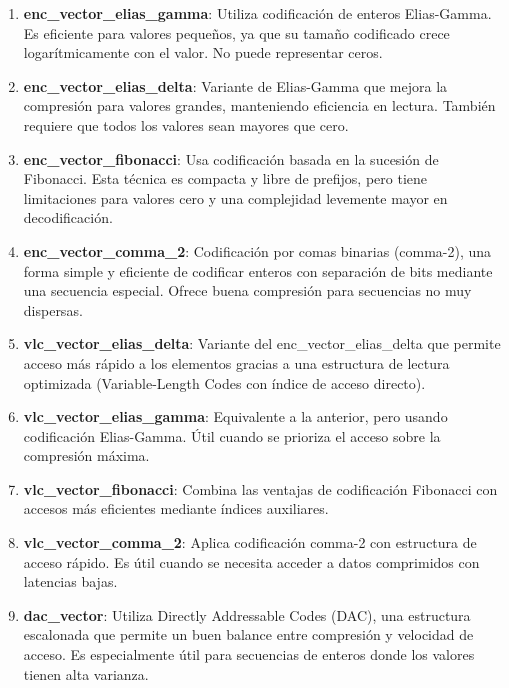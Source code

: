 \begin{enumerate}
    \item \textbf{enc\_vector\_elias\_gamma}:
    Utiliza codificación de enteros Elias-Gamma. Es eficiente para valores pequeños, ya que su tamaño codificado crece logarítmicamente con el valor. No puede representar ceros.

    \item \textbf{enc\_vector\_elias\_delta}:
    Variante de Elias-Gamma que mejora la compresión para valores grandes, manteniendo eficiencia en lectura. También requiere que todos los valores sean mayores que cero.

    \item \textbf{enc\_vector\_fibonacci}:
    Usa codificación basada en la sucesión de Fibonacci. Esta técnica es compacta y libre de prefijos, pero tiene limitaciones para valores cero y una complejidad levemente mayor en decodificación.

    \item \textbf{enc\_vector\_comma\_2}:
    Codificación por comas binarias (comma-2), una forma simple y eficiente de codificar enteros con separación de bits mediante una secuencia especial. Ofrece buena compresión para secuencias no muy dispersas.

    \item \textbf{vlc\_vector\_elias\_delta}:
    Variante del enc\_vector\_elias\_delta que permite acceso más rápido a los elementos gracias a una estructura de lectura optimizada (Variable-Length Codes con índice de acceso directo).

    \item \textbf{vlc\_vector\_elias\_gamma}:
    Equivalente a la anterior, pero usando codificación Elias-Gamma. Útil cuando se prioriza el acceso sobre la compresión máxima.

    \item \textbf{vlc\_vector\_fibonacci}:
    Combina las ventajas de codificación Fibonacci con accesos más eficientes mediante índices auxiliares.

    \item \textbf{vlc\_vector\_comma\_2}:
    Aplica codificación comma-2 con estructura de acceso rápido. Es útil cuando se necesita acceder a datos comprimidos con latencias bajas.

    \item \textbf{dac\_vector}:
    Utiliza Directly Addressable Codes (DAC), una estructura escalonada que permite un buen balance entre compresión y velocidad de acceso. Es especialmente útil para secuencias de enteros donde los valores tienen alta varianza.

\end{enumerate}

